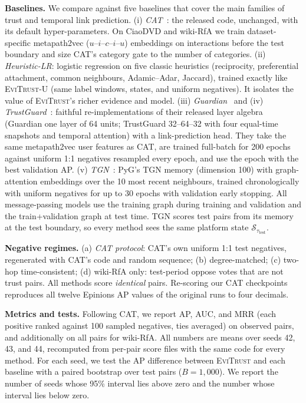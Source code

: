 \documentclass[conference]{IEEEtran}
\newcommand{\evi}{\textsc{EviTrust}}
\newcommand{\eviU}{\textsc{EviTrust}-U}
\begin{document}
\textbf{Baselines.} We compare against five baselines that cover the main families of trust and temporal link prediction.
(i) \emph{CAT}~\cite{wang2025cat}: the released code, unchanged, with its default hyper-parameters. On CiaoDVD and wiki-RfA we train dataset-specific metapath2vec ($u$--$i$--$c$--$i$--$u$) embeddings on interactions before the test boundary and size CAT's category gate to the number of categories.
(ii) \emph{Heuristic-LR}: logistic regression on five classic heuristics (reciprocity, preferential attachment, common neighbours, Adamic--Adar, Jaccard), trained exactly like \eviU{} (same label windows, states, and uniform negatives). It isolates the value of \evi{}'s richer evidence and model.
(iii) \emph{Guardian}~\cite{lin2020guardian} and (iv) \emph{TrustGuard}~\cite{wang2024trustguard}: faithful re-implementations of their released layer algebra (Guardian one layer of 64 units; TrustGuard 32--64--32 with four equal-time snapshots and temporal attention) with a link-prediction head. They take the same metapath2vec user features as CAT, are trained full-batch for 200 epochs against uniform 1:1 negatives resampled every epoch, and use the epoch with the best validation AP.
(v) \emph{TGN}~\cite{rossi2020tgn}: PyG's TGN memory (dimension 100) with graph-attention embeddings over the 10 most recent neighbours, trained chronologically with uniform negatives for up to 30 epochs with validation early stopping.
All message-passing models use the training graph during training and validation and the train+validation graph at test time. TGN scores test pairs from its memory at the test boundary, so every method sees the same platform state $\mathcal{S}_{\tau_{\text{test}}}$.

\textbf{Negative regimes.} (a) \emph{CAT protocol}: CAT's own uniform 1:1 test negatives, regenerated with CAT's code and random sequence; (b) degree-matched; (c) two-hop time-consistent; (d) wiki-RfA only: test-period oppose votes that are not trust pairs. All methods score \emph{identical} pairs. Re-scoring our CAT checkpoints reproduces all twelve Epinions AP values of the original runs to four decimals.

\textbf{Metrics and tests.} Following CAT, we report AP, AUC, and MRR (each positive ranked against 100 sampled negatives, ties averaged) on observed pairs, and additionally on all pairs for wiki-RfA. All numbers are means over seeds 42, 43, and 44, recomputed from per-pair score files with the same code for every method. For each seed, we test the AP difference between \evi{} and each baseline with a paired bootstrap over test pairs ($B=1{,}000$). We report the number of seeds whose 95\% interval lies above zero and the number whose interval lies below zero.
\end{document}
